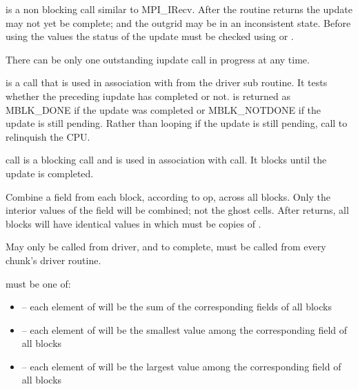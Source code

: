 \documentclass[10pt]{article}
\begin{document}
      is a non blocking call similar to MPI\_IRecv.
     After the routine returns the update may not yet be complete; and the
     outgrid may be in an inconsistent state.  Before using the values the 
     status of the
     update must be checked using  or 
     .

     There can be only one outstanding iupdate call in progress at any time.
     
\vspace{0.2in}
      is a call that is used in association with 
      from the driver sub routine.  It tests whether
      the preceding iupdate has completed or not.
      is returned as MBLK\_DONE if the update was completed or 
      MBLK\_NOTDONE if the update is still pending.
     Rather than looping if the update is still pending, call 
     to relinquish the CPU.

\vspace{0.2in}
      call is a blocking call and is used in association 
     with  call. It blocks until the update is completed.

\vspace{0.2 in}
     Combine a field from each block, according to op, across all blocks.
     Only the interior values of the field will be combined; not the ghost cells.
     After  returns, all blocks will have identical
values in  which must be  copies of .


     May only be called from driver, and to complete, must be called
     from every chunk's driver routine.

      must be one of:

\begin{itemize}
        \item {}-- each element of  will be the sum 
of the corresponding fields of all blocks
        \item {}-- each element of  will be the 
smallest value among the corresponding field of all blocks
        \item {}-- each element of  will be the largest 
value among the corresponding field of all blocks
\end{itemize}
\end{document}

